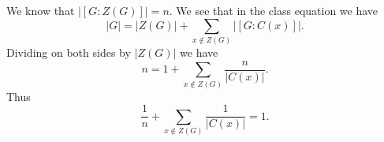 \documentclass{article}
\begin{document}
\section{} %
We know that $|[G:Z(G)]| =n.$ We see that in the class equation we have 
$$|G| =|Z(G)|+\sum_{x \notin Z(G)}|[G:C(x)]|.$$ 
Dividing on both sides by $|Z(G)|$ we have $$n= 1+\sum_{x \notin Z(G)}\frac{n}{|C(x)|}.$$
Thus $$\frac{1}{n}+\sum_{x \notin Z(G)}\frac{1}{|C(x)|}=1.$$  
\section{} %
\section{} %
\section{} %
\end{document}
